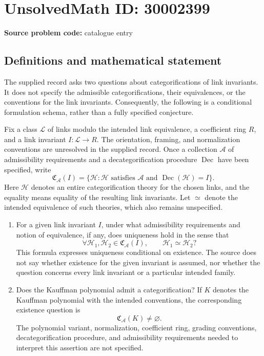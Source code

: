 \documentclass[11pt]{article}
\begin{document}
\section*{UnsolvedMath ID: 30002399}
\textbf{Source problem code:} catalogue entry
\subsection{Definitions and mathematical statement}
The supplied record asks two questions about categorifications of link invariants. It does not specify the admissible categorifications, their equivalences, or the conventions for the link invariants. Consequently, the following is a conditional formulation schema, rather than a fully specified conjecture.

Fix a class \(\mathcal L\) of links modulo the intended link equivalence, a coefficient ring \(R\), and a link invariant \(I\colon\mathcal L\to R\). The orientation, framing, and normalization conventions are unresolved in the supplied record. Once a collection \(\mathcal A\) of admissibility requirements and a decategorification procedure \(\operatorname{Dec}\) have been specified, write
\[
\mathfrak C_{\mathcal A}(I)
 =\{\mathcal H: \mathcal H\text{ satisfies }\mathcal A
       \text{ and }\operatorname{Dec}(\mathcal H)=I\}.
\]
Here \(\mathcal H\) denotes an entire categorification theory for the chosen links, and the equality means equality of the resulting link invariants. Let \(\simeq\) denote the intended equivalence of such theories, which also remains unspecified.

\begin{enumerate}
\item For a given link invariant \(I\), under what admissibility requirements and notion of equivalence, if any, does uniqueness hold in the sense that
\[
\forall\mathcal H_1,\mathcal H_2\in\mathfrak C_{\mathcal A}(I),
\qquad \mathcal H_1\simeq\mathcal H_2?
\]
This formula expresses uniqueness conditional on existence. The source does not say whether existence for the given invariant is assumed, nor whether the question concerns every link invariant or a particular intended family.
\item Does the Kauffman polynomial admit a categorification? If \(K\) denotes the Kauffman polynomial with the intended conventions, the corresponding existence question is
\[
\mathfrak C_{\mathcal A}(K)\ne\varnothing.
\]
The polynomial variant, normalization, coefficient ring, grading conventions, decategorification procedure, and admissibility requirements needed to interpret this assertion are not specified.
\end{enumerate}
\end{document}
